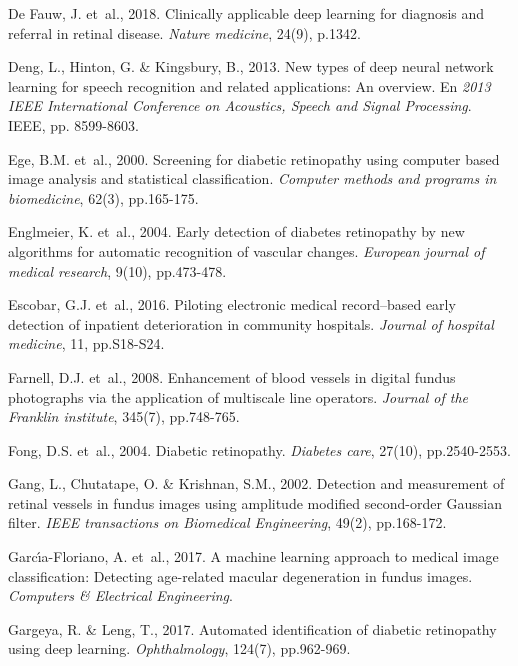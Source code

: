 \documentclass[
  12pt,
  spanish,
  a4paperpaper,
]{report}
\begin{document}
\leavevmode\hypertarget{ref-de2018clinically}{}%
De Fauw, J. et~al., 2018. Clinically applicable deep learning for
diagnosis and referral in retinal disease. \emph{Nature medicine},
24(9), p.1342.

\leavevmode\hypertarget{ref-deng2013new}{}%
Deng, L., Hinton, G. \& Kingsbury, B., 2013. New types of deep neural
network learning for speech recognition and related applications: An
overview. En \emph{2013 IEEE International Conference on Acoustics,
Speech and Signal Processing}. IEEE, pp. 8599-8603.

\leavevmode\hypertarget{ref-ege2000screening}{}%
Ege, B.M. et~al., 2000. Screening for diabetic retinopathy using
computer based image analysis and statistical classification.
\emph{Computer methods and programs in biomedicine}, 62(3), pp.165-175.

\leavevmode\hypertarget{ref-englmeier2004early}{}%
Englmeier, K. et~al., 2004. Early detection of diabetes retinopathy by
new algorithms for automatic recognition of vascular changes.
\emph{European journal of medical research}, 9(10), pp.473-478.

\leavevmode\hypertarget{ref-escobar2016piloting}{}%
Escobar, G.J. et~al., 2016. Piloting electronic medical record--based
early detection of inpatient deterioration in community hospitals.
\emph{Journal of hospital medicine}, 11, pp.S18-S24.

\leavevmode\hypertarget{ref-farnell2008enhancement}{}%
Farnell, D.J. et~al., 2008. Enhancement of blood vessels in digital
fundus photographs via the application of multiscale line operators.
\emph{Journal of the Franklin institute}, 345(7), pp.748-765.

\leavevmode\hypertarget{ref-fong2004diabetic}{}%
Fong, D.S. et~al., 2004. Diabetic retinopathy. \emph{Diabetes care},
27(10), pp.2540-2553.

\leavevmode\hypertarget{ref-gang2002detection}{}%
Gang, L., Chutatape, O. \& Krishnan, S.M., 2002. Detection and
measurement of retinal vessels in fundus images using amplitude modified
second-order Gaussian filter. \emph{IEEE transactions on Biomedical
Engineering}, 49(2), pp.168-172.

\leavevmode\hypertarget{ref-garcia2017machine}{}%
Garcı́a-Floriano, A. et~al., 2017. A machine learning approach to medical
image classification: Detecting age-related macular degeneration in
fundus images. \emph{Computers \& Electrical Engineering}.

\leavevmode\hypertarget{ref-gargeya2017automated}{}%
Gargeya, R. \& Leng, T., 2017. Automated identification of diabetic
retinopathy using deep learning. \emph{Ophthalmology}, 124(7),
pp.962-969.
\end{document}
